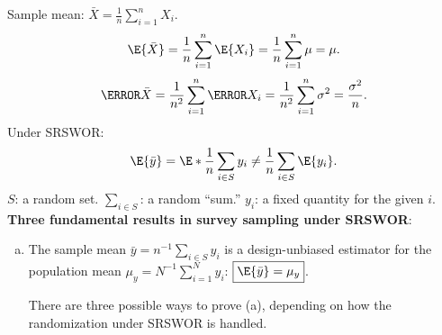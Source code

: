 \documentclass[oneside]{book}\usepackage[]{graphicx}\usepackage[svgnames]{xcolor}
\begin{document}
Sample mean: $ \bar{X}=\frac{1}{n}\sum_{i=1}^{n}X_i $.
\[ \E{\bar{X}}=\frac{1}{n}\sum_{i=1}^{n}\E{X_i}=\frac{1}{n}\sum_{i=1}^{n}\mu=\mu. \]
\[ \V{\bar{X}}=\frac{1}{n^2}\sum_{i=1}^{n}\V{X_i}=\frac{1}{n^2}\sum_{i=1}^{n}\sigma^2=\frac{\sigma^2}{n}. \]
Under SRSWOR:
\[ \E{\bar{y}}=\E*{\frac{1}{n}\sum_{i\in S}y_i}\ne \frac{1}{n}\sum_{i\in S}\E{y_i}. \]
$ S $: a random set.
$ \sum_{i\in S} $: a random ``sum.''
$ y_i $: a fixed quantity for the given $ i $.
\textbf{Three fundamental results in survey sampling under SRSWOR}:
\begin{enumerate}[(a)]
      \item The sample mean $ \bar{y}=n^{-1}\sum_{i\in S}y_i $
            is a design-unbiased estimator for the population
            mean $ \mu_y=N^{-1}\sum_{i=1}^{N}y_i $: $ \boxed{\E{\bar{y}}=\mu_y} $.

            There are three possible ways to prove (a), depending on how
            the randomization under SRSWOR is handled.


\end{enumerate}
\end{document}
